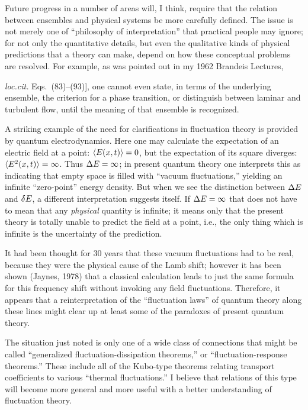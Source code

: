 Future progress in a number of areas will, I think, require that the relation between ensembles and physical systems be more carefully defined.
The issue is not merely one of ``philosophy of interpretation'' that practical people may ignore; for not only the quantitative details, but even the qualitative kinds of physical predictions that a theory can make, depend on how these conceptual problems are resolved.
For example, as was pointed out in my 1962 Brandeis Lectures, {\emph{loc.cit.} Eqs.~(83)--(93)], one cannot even state, in terms of the underlying ensemble, the criterion for a phase transition, or distinguish between laminar and turbulent flow, until the meaning of that ensemble is recognized.

A striking example of the need for clarifications in fluctuation theory is provided by quantum electrodynamics.
Here one may calculate the expectation of an electric field at a point: $\langle E(x,t)\rangle = 0$, but the expectation of its square diverges: $\langle E^2(x, t)\rangle = \infty$.
Thus $\mathop{}\!\Delta E = \infty$; in present quantum theory one interprets this as indicating that empty space is filled with ``vacuum fluctuations,'' yielding an infinite ``zero-point'' energy density.
But when we see the distinction between $\mathop{}\!\Delta E$ and $\mathop{}\!\delta E$, a different interpretation suggests itself.
If $\mathop{}\!\Delta E = \infty$ that does not have to mean that any \emph{physical} quantity is infinite; it means only that the present theory is totally unable to predict the field at a point, i.e., the only thing which is infinite is the uncertainty of the prediction.

It had been thought for 30 years that these vacuum fluctuations had to be real, because they were the physical cause of the Lamb shift; however it has been shown (Jaynes, \cite{jaynes78}{1978}) that a classical calculation leads to just the same formula for this frequency shift without invoking any field fluctuations.
Therefore, it appears that a reinterpretation of the ``fluctuation laws'' of quantum theory along these lines might clear up at least some of the paradoxes of present quantum theory.

The situation just noted is only one of a wide class of connections that might be called ``generalized fluctuation-dissipation theorems,'' or ``fluctu\-ation-response theorems.''
These include all of the Kubo-type theorems relating transport coefficients to various ``thermal fluctuations.''
I believe that relations of this type will become more general and more useful with a better understanding of fluctuation theory.

}
